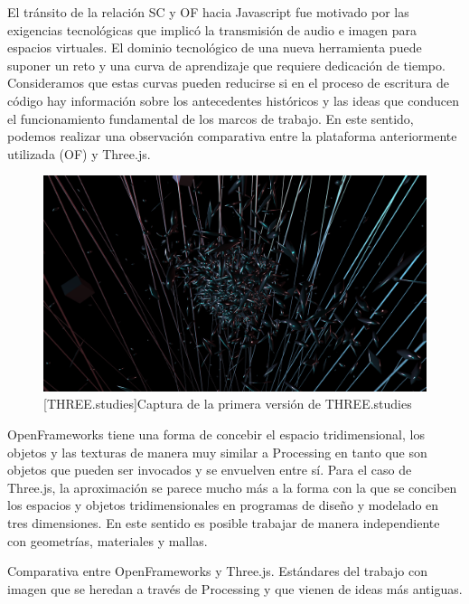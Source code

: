 El tránsito de la relación SC y OF hacia Javascript fue motivado por las exigencias tecnológicas que implicó la transmisión de audio e imagen para espacios virtuales. El dominio tecnológico de una nueva herramienta puede suponer un reto y una curva de aprendizaje que requiere dedicación de tiempo. Consideramos que estas curvas pueden reducirse si en el proceso de escritura de código hay información sobre los antecedentes históricos y las ideas que conducen el funcionamiento fundamental de los marcos de trabajo. En este sentido, podemos realizar una observación comparativa entre la plataforma anteriormente utilizada (OF) y Three.js.

\begin{figure}
\includegraphics[width=\columnwidth]{../img/imagen2.png}
[THREE.studies]{Captura de la primera versión de THREE.studies} %
\label{fig:gallery} 
\end{figure}
\clearpage

OpenFrameworks tiene una forma de concebir el espacio tridimensional, los objetos y las texturas de manera muy similar a Processing en tanto que son objetos que pueden ser invocados y se envuelven entre sí. Para el caso de Three.js, la aproximación se parece mucho más a la forma con la que se conciben los espacios y objetos tridimensionales en programas de diseño y modelado en tres dimensiones. En este sentido es posible trabajar de manera independiente con geometrías, materiales y mallas. 

Comparativa entre OpenFrameworks y Three.js. Estándares del trabajo con imagen que se heredan a través de Processing y que vienen de ideas más antiguas. 


